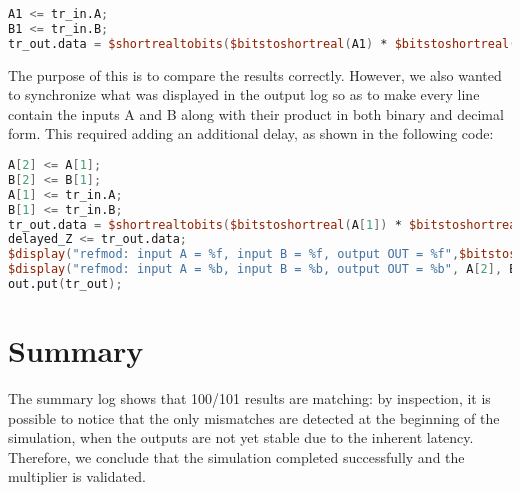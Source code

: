 \begin{lstlisting}[language = verilog]
A1 <= tr_in.A;
B1 <= tr_in.B;
tr_out.data = $shortrealtobits($bitstoshortreal(A1) * $bitstoshortreal(B1));	
\end{lstlisting}

The purpose of this is to compare the results correctly. However, we also wanted to synchronize what was displayed in the output log so as to make every line contain the inputs A and B along with their product in both binary and decimal form. This required adding an additional delay, as shown in the following code:
\begin{lstlisting}[language = verilog]
A[2] <= A[1];
B[2] <= B[1];
A[1] <= tr_in.A;
B[1] <= tr_in.B;
tr_out.data = $shortrealtobits($bitstoshortreal(A[1]) * $bitstoshortreal(B[1]));		
delayed_Z <= tr_out.data;
$display("refmod: input A = %f, input B = %f, output OUT = %f",$bitstoshortreal(A[2]), $bitstoshortreal(B[2]), $bitstoshortreal(delayed_Z));
$display("refmod: input A = %b, input B = %b, output OUT = %b", A[2], B[2], delayed_Z);
out.put(tr_out);
\end{lstlisting}

\section{Summary}
The summary log shows that 100/101 results are matching: by inspection, it is possible to notice that the only mismatches are detected at the beginning of the simulation, when the outputs are not yet stable due to the inherent latency. Therefore, we conclude that the simulation completed successfully and the multiplier is validated.